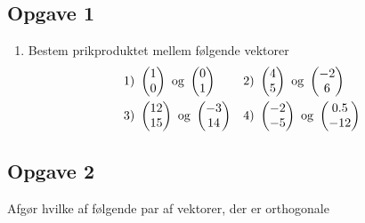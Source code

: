 \subsection*{Opgave 1}
\begin{enumerate}[label=\roman*)]
\item Bestem prikproduktet mellem følgende vektorer
\begin{align*}
&1) \ \begin{pmatrix}1 \\ 0\end{pmatrix} \textnormal{ og } \begin{pmatrix}0 \\ 1\end{pmatrix}    &&2) \  \begin{pmatrix} 4 \\  5\end{pmatrix} \textnormal{ og } \begin{pmatrix} -2  \\ 6\end{pmatrix}    \\
&3) \ \begin{pmatrix}12 \\ 15\end{pmatrix} \textnormal{ og } \begin{pmatrix}-3 \\ 14 \end{pmatrix}   &&4) \ \begin{pmatrix} -2 \\ -5\end{pmatrix} \textnormal{ og } \begin{pmatrix} 0.5 \\ -12 \end{pmatrix}     \\
\end{align*}
\end{enumerate}

\subsection*{Opgave 2}

Afgør hvilke af følgende par af vektorer, der er orthogonale

